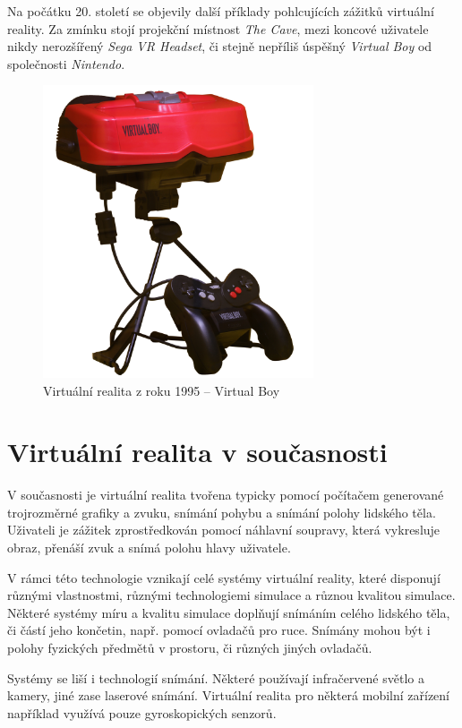 Na počátku 20. století se objevily další příklady pohlcujících zážitků
virtuální reality. Za zmínku stojí projekční místnost \emph{The Cave},
mezi koncové uživatele nikdy nerozšířený \emph{Sega VR Headset}, či
stejně nepříliš úspěšný \emph{Virtual Boy} od společnosti
\emph{Nintendo}.

\begin{figure}[h!]
\centering
\includegraphics[width=8cm]{src/assets/virtual-boy.jpg}
\caption{Virtuální realita z roku 1995 -- Virtual Boy\autocite{virtualboypic}}
\end{figure}

\section{Virtuální realita v
současnosti}\label{virtuuxe1lnuxed-realita-v-souux10dasnosti}

V současnosti je virtuální realita tvořena typicky pomocí počítačem
generované trojrozměrné grafiky a zvuku, snímání pohybu a snímání polohy
lidského těla. Uživateli je zážitek zprostředkován pomocí náhlavní
soupravy, která vykresluje obraz, přenáší zvuk a snímá polohu hlavy
uživatele.

V rámci této technologie vznikají celé systémy virtuální reality,
které disponují různými vlastnostmi, různými technologiemi simulace a
různou kvalitou simulace. Některé systémy míru a kvalitu simulace
doplňují snímáním celého lidského těla, či částí jeho končetin, např.
pomocí ovladačů pro ruce. Snímány mohou být i polohy fyzických předmětů v prostoru, či
různých jiných ovladačů. 

Systémy se liší i technologií snímání.
Některé používají infračervené světlo a kamery, jiné zase laserové
snímání. Virtuální realita pro některá mobilní zařízení například
využívá pouze gyroskopických senzorů.

